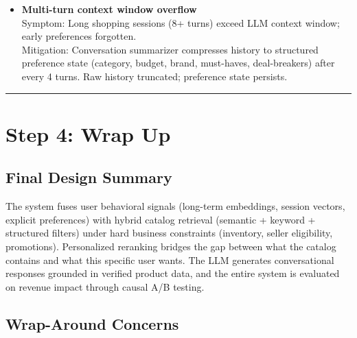 \begin{itemize}
  \item \textbf{Multi-turn context window overflow}\\
    Symptom: Long shopping sessions (8+ turns) exceed LLM context window; early preferences forgotten.\\
    Mitigation: Conversation summarizer compresses history to structured preference state (category, budget, brand, must-haves, deal-breakers) after every 4 turns. Raw history truncated; preference state persists.
\end{itemize}

\bigskip\hrule\bigskip

\section*{Step 4: Wrap Up}

\subsection*{Final Design Summary}

The system fuses user behavioral signals (long-term embeddings, session vectors, explicit preferences) with hybrid catalog retrieval (semantic + keyword + structured filters) under hard business constraints (inventory, seller eligibility, promotions). Personalized reranking bridges the gap between what the catalog contains and what this specific user wants. The LLM generates conversational responses grounded in verified product data, and the entire system is evaluated on revenue impact through causal A/B testing.

\subsection*{Wrap-Around Concerns}

